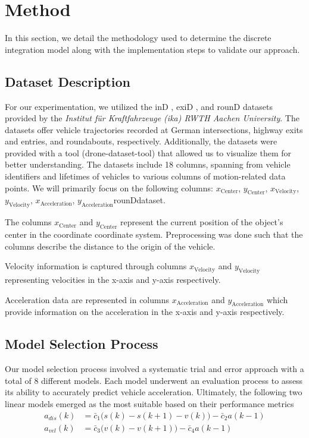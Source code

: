 \section{Method}

In this section, we detail the methodology used to determine the discrete integration model
along with the implementation steps to validate our approach.

\subsection{Dataset Description} \label{sec:dataset_descrition}
For our experimentation, we utilized the inD \cite{inDdataset}, exiD \cite{exiDdataset}, and rounD \cite{rounDdataset} datasets provided by the 
\textit{Institut für Kraftfahrzeuge (ika) RWTH Aachen University}.
The datasets offer vehicle trajectories recorded at German intersections, highway exits and entries, 
and roundabouts, respectively. 
Additionally, the datasets were provided with a tool (drone-dataset-tool) \cite{repo:drone-dataset-tool} that allowed us to visualize them for better understanding. 
The datasets include 18 columns, spanning from vehicle identifiers and lifetimes of vehicles to various columns of motion-related data points.
We will primarily focus on the following columns:
$x_{\text{Center}}$, $y_{\text{Center}}$, $x_{\text{Velocity}}$, $y_{\text{Velocity}}$, $x_{\text{Acceleration}}$, 
$y_{\text{Acceleration}}$rounDdataset.

The columns  $x_{\text{Center}}$ and $y_{\text{Center}}$ represent the current position of the object's center in the coordinate coordinate system. Preprocessing was done such that the columns describe the distance to the origin of the vehicle.

Velocity information is captured through columns $x_{\text{Velocity}}$ and $y_{\text{Velocity}}$ representing velocities 
in the x-axis and y-axis respectively.

Acceleration data are represented in columns $x_{\text{Acceleration}}$ and $y_{\text{Acceleration}}$ which provide 
information on the acceleration in the x-axis and y-axis respectively.

\subsection{Model Selection Process} 
Our model selection process involved a systematic trial and error approach with a total of 8 different models. 
Each model underwent an evaluation process to assess its ability to accurately predict vehicle acceleration. 
Ultimately, the following two linear models emerged as the most suitable based on their performance metrics
\begin{align} 
    a_{dis}(k) &= \bar{c}_1 \bigl( s(k) - s(k+1) - v(k) \bigr) -\bar{c}_2 a(k-1) \\
    a_{vel}(k) &= \bar{c}_3 \bigl( v(k) - v(k+1) \bigr) -\bar{c}_4 a(k-1) 
\end{align}

